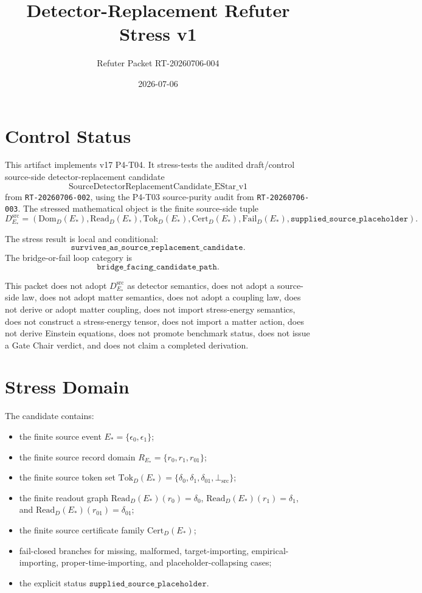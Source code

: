 \documentclass[11pt]{article}
\title{Detector-Replacement Refuter Stress v1}
\author{Refuter Packet RT-20260706-004}
\date{2026-07-06}
\newcommand{\EStar}{E_{\ast}}
\newcommand{\RStar}{R_{E_{\ast}}}
\newcommand{\DSrc}{D^{\mathrm{src}}_{E_{\ast}}}
\newcommand{\DomD}{\mathrm{Dom}_{D}(E_{\ast})}
\newcommand{\ReadD}{\mathrm{Read}_{D}(E_{\ast})}
\newcommand{\TokD}{\mathrm{Tok}_{D}(E_{\ast})}
\newcommand{\CertD}{\mathrm{Cert}_{D}(E_{\ast})}
\newcommand{\FailD}{\mathrm{Fail}_{D}(E_{\ast})}
\newcommand{\BottomSrc}{\bot_{\mathrm{src}}}
\begin{document}
\maketitle

\section{Control Status}

This artifact implements v17 P4-T04. It stress-tests the audited
draft/control source-side detector-replacement candidate
\[
  \mathrm{SourceDetectorReplacementCandidate\_EStar\_v1}
\]
from \texttt{RT-20260706-002}, using the P4-T03 source-purity audit from
\texttt{RT-20260706-003}. The stressed mathematical object is the finite
source-side tuple
\[
  \DSrc=(\DomD,\ReadD,\TokD,\CertD,\FailD,
  \texttt{supplied\_source\_placeholder}).
\]

The stress result is local and conditional:
\[
  \texttt{survives\_as\_source\_replacement\_candidate}.
\]
The bridge-or-fail loop category is
\[
  \texttt{bridge\_facing\_candidate\_path}.
\]

This packet does not adopt \(\DSrc\) as detector semantics, does not adopt a
source-side law, does not adopt matter semantics, does not adopt a coupling
law, does not derive or adopt matter coupling, does not import stress-energy
semantics, does not construct a stress-energy tensor, does not import a matter
action, does not derive Einstein equations, does not promote benchmark status,
does not issue a Gate Chair verdict, and does not claim a completed
derivation.

\section{Stress Domain}

The candidate contains:

\begin{itemize}[leftmargin=2em]
  \item the finite source event \(\EStar=\{\epsilon_0,\epsilon_1\}\);
  \item the finite source record domain
        \(\RStar=\{r_0,r_1,r_{01}\}\);
  \item the finite source token set
        \(\TokD=\{\delta_0,\delta_1,\delta_{01},\BottomSrc\}\);
  \item the finite readout graph
        \(\ReadD(r_0)=\delta_0\), \(\ReadD(r_1)=\delta_1\), and
        \(\ReadD(r_{01})=\delta_{01}\);
  \item the finite source certificate family \(\CertD\);
  \item fail-closed branches for missing, malformed, target-importing,
        empirical-importing, proper-time-importing, and
        placeholder-collapsing cases;
  \item the explicit status \(\texttt{supplied\_source\_placeholder}\).
\end{itemize}
\end{document}
